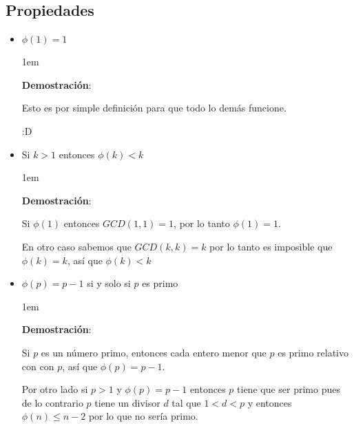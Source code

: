 \documentclass[12pt, fleqn]{report}                             %
\newenvironment{SmallIndentation}[1][0.75em]                    %
    {\begin{adjustwidth}{#1}{}\begin{footnotesize}}                 %
    {\end{footnotesize}\end{adjustwidth}}                           %
\begin{document}
        \subsection{Propiedades}

            \begin{itemize}

                \item $\phi(1) = 1$
                    \begin{SmallIndentation}[1em]
                        \textbf{Demostración}:
                        
                        Esto es por simple definición para que todo lo demás funcione.

                        :D
                    
                    \end{SmallIndentation}
                        

                \item Si $k > 1$ entonces $\phi(k) < k$
                
                    \begin{SmallIndentation}[1em]
                        \textbf{Demostración}:

                        Si $\phi(1)$ entonces $GCD(1,1) = 1$, por lo tanto
                        $\phi(1)=1$.

                        En otro caso sabemos que $GCD(k, k) = k$ por lo tanto
                        es imposible que $\phi(k)=k$, así que $\phi(k) < k$

                    \end{SmallIndentation}


                \item $\phi(p) = p - 1$ si y solo si $p$ es primo

                    \begin{SmallIndentation}[1em]
                        \textbf{Demostración}:

                        Si $p$ es un número primo, entonces cada entero menor
                        que $p$ es primo relativo con con $p$, así que 
                        $\phi(p) = p-1$.

                        Por otro lado si $p > 1$ y $\phi(p) = p-1$ entonces $p$
                        tiene que ser primo pues de lo contrario $p$ tiene
                        un divisor $d$ tal que $1<d<p$ y entonces
                        $\phi(n) \leq n-2$ por lo que no sería primo.


\end{SmallIndentation}
\end{itemize}
\end{document}
